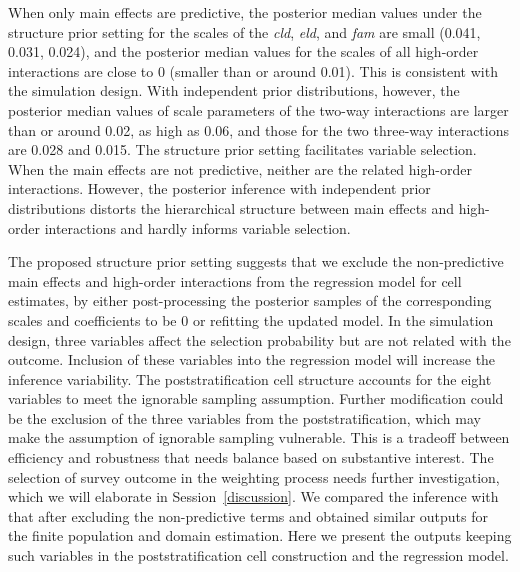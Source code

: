 \documentclass[11pt]{article}
\begin{document}
When only main effects are predictive, the posterior median values under the structure prior setting for the scales of the {\em cld}, {\em eld}, and {\em fam} are small (0.041, 0.031, 0.024), and the posterior median values for the scales of all high-order interactions are close to 0 (smaller than or around 0.01). This is consistent with the simulation design. With independent prior distributions, however, the posterior median values of scale parameters of the two-way interactions are larger than or around 0.02, as high as 0.06, and those for the two three-way interactions are 0.028 and 0.015. The structure prior setting facilitates variable selection. When the main effects are not predictive, neither are the related high-order interactions. However, the posterior inference with independent prior distributions distorts the hierarchical structure between main effects and high-order interactions and hardly informs variable selection. 

The proposed structure prior setting suggests that we exclude the non-predictive main effects and high-order interactions from the regression model for cell estimates, by either post-processing the posterior samples of the corresponding scales and coefficients to be 0 or refitting the updated model. In the simulation design, three variables affect the selection probability but are not related with the outcome. Inclusion of these variables into the regression model will increase the inference variability. The poststratification cell structure accounts for the eight variables to meet the ignorable sampling assumption. Further modification could be the exclusion of the three variables from the poststratification, which may make the assumption of ignorable sampling vulnerable. This is a tradeoff between efficiency and robustness that needs balance based on substantive interest. The selection of survey outcome in the weighting process needs further investigation, which we will elaborate in Session~\ref{discussion}. We compared the inference with that after excluding the non-predictive terms and obtained similar outputs for the finite population and domain estimation. Here we present the outputs keeping such variables in the poststratification cell construction and the regression model.
\end{document}
